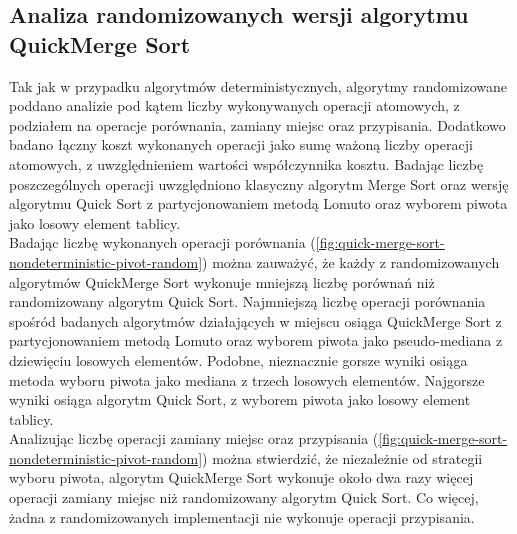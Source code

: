 \begin{figure}[]
	\centering
	
	\caption[]{}
	\label{fig:quick-merge-sort-deterministic-pivot-random}
\end{figure}

\subsection{Analiza randomizowanych wersji algorytmu QuickMerge Sort}
Tak jak w przypadku algorytmów deterministycznych, algorytmy randomizowane poddano analizie pod kątem liczby wykonywanych operacji atomowych, z podziałem na operacje porównania, zamiany miejsc oraz przypisania. Dodatkowo badano łączny koszt wykonanych operacji jako sumę ważoną liczby operacji atomowych, z uwzględnieniem wartości współczynnika kosztu. Badając liczbę poszczególnych operacji uwzględniono klasyczny algorytm Merge Sort oraz wersję algorytmu Quick Sort z partycjonowaniem metodą Lomuto oraz wyborem piwota jako losowy element tablicy.\\

Badając liczbę wykonanych operacji porównania (\ref{fig:quick-merge-sort-nondeterministic-pivot-random}) można zauważyć, 
że każdy z randomizowanych algorytmów QuickMerge Sort wykonuje mniejszą liczbę porównań niż randomizowany algorytm Quick Sort. Najmniejszą liczbę operacji porównania spośród badanych algorytmów działających w miejscu osiąga QuickMerge Sort z partycjonowaniem metodą Lomuto oraz wyborem piwota jako pseudo-mediana z dziewięciu losowych elementów. Podobne, nieznacznie gorsze wyniki osiąga metoda wyboru piwota jako mediana z trzech losowych elementów. Najgorsze wyniki osiąga algorytm Quick Sort, z wyborem piwota jako losowy element tablicy.\\

Analizując liczbę operacji zamiany miejsc oraz przypisania (\ref{fig:quick-merge-sort-nondeterministic-pivot-random}) można stwierdzić, że niezależnie od strategii wyboru piwota, algorytm QuickMerge Sort wykonuje około dwa razy więcej operacji zamiany miejsc niż randomizowany algorytm Quick Sort. Co więcej, żadna z randomizowanych implementacji nie wykonuje operacji przypisania.\\

